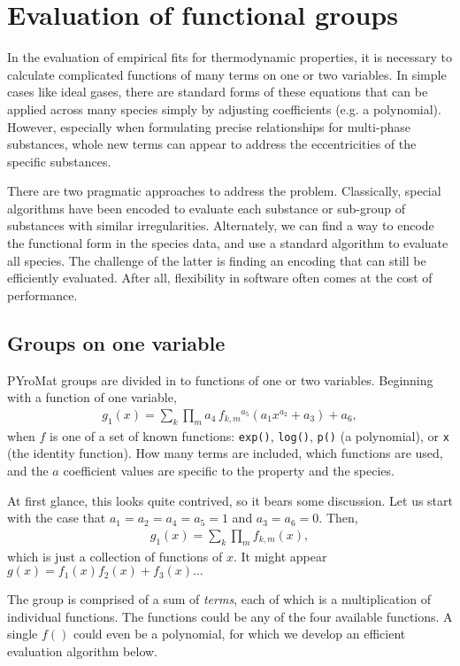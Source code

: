 \documentclass[twocolumn,letterpaper,11pt]{article}
\begin{document}
\section{Evaluation of functional groups}
In the evaluation of empirical fits for thermodynamic properties, it is necessary to calculate complicated functions of many terms on one or two variables.  In simple cases like ideal gases, there are standard forms of these equations that can be applied across many species simply by adjusting coefficients (e.g. a polynomial).  However, especially when formulating precise relationships for multi-phase substances, whole new terms can appear to address the eccentricities of the specific substances.  

There are two pragmatic approaches to address the problem.  Classically, special algorithms have been encoded to evaluate each substance or sub-group of substances with similar irregularities.  Alternately, we can find a way to encode the functional form in the species data, and use a standard algorithm to evaluate all species.  The challenge of the latter is finding an encoding that can still be efficiently evaluated.  After all, flexibility in software often comes at the cost of performance.

\subsection{Groups on one variable}
PYroMat groups are divided in to functions of one or two variables.  Beginning with a function of one variable,
\begin{align}
g_1(x) = \sum_k \prod_m a_4\,f_{k,m}{^{a_5}}(a_1 x^{a_2} + a_3) + a_6, \label{eqn:g1}
\end{align}
when $f$ is one of a set of known functions: \verb|exp()|, \verb|log()|, \verb|p()| (a polynomial), or \verb|x| (the identity function).  How many terms are included, which functions are used, and the $a$ coefficient values are specific to the property and the species.

At first glance, this looks quite contrived, so it bears some discussion.  Let us start with the case that $a_1=a_2=a_4=a_5=1$ and $a_3=a_6=0$.  Then,
\begin{align}
g_1(x) = \sum_k \prod_m f_{k,m}(x),\label{eqn:g1:simple}
\end{align}
which is just a collection of functions of $x$.  It might appear $g(x) = f_1(x)f_2(x) + f_3(x) \ldots$

The group is comprised of a sum of \emph{terms}, each of which is a multiplication of individual functions.  The functions could be any of the four available functions.  A single $f()$ could even be a polynomial, for which we develop an efficient evaluation algorithm below.
\end{document}
